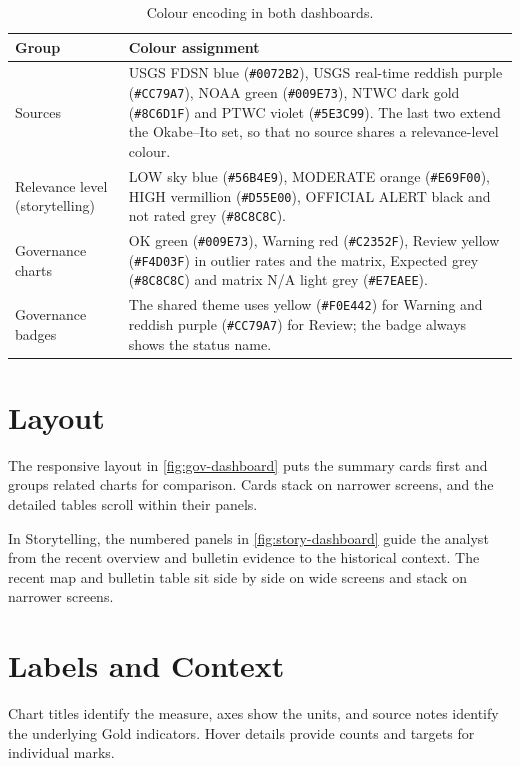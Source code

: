 \documentclass[a4paper,11pt,oneside]{book}
\renewcommand{\arraystretch}{1.25}
\begin{document}
\begin{table}[!htbp]
\centering
\small
\renewcommand{\arraystretch}{1.12}
\captionsetup{skip=6pt}
\begin{tabularx}{\textwidth}{@{}L{2.6cm}Y@{}}
\toprule
Group & Colour assignment \\
\midrule
Sources & USGS FDSN blue (\texttt{\#0072B2}), USGS real-time reddish purple (\texttt{\#CC79A7}), NOAA green (\texttt{\#009E73}), NTWC dark gold (\texttt{\#8C6D1F}) and PTWC violet (\texttt{\#5E3C99}). The last two extend the Okabe--Ito set, so that no source shares a relevance-level colour. \\
Relevance level (storytelling) & LOW sky blue (\texttt{\#56B4E9}), MODERATE orange (\texttt{\#E69F00}), HIGH vermillion (\texttt{\#D55E00}), OFFICIAL ALERT black and not rated grey (\texttt{\#8C8C8C}). \\
Governance charts & OK green (\texttt{\#009E73}), Warning red (\texttt{\#C2352F}), Review yellow (\texttt{\#F4D03F}) in outlier rates and the matrix, Expected grey (\texttt{\#8C8C8C}) and matrix N/A light grey (\texttt{\#E7EAEE}). \\
Governance badges & The shared theme uses yellow (\texttt{\#F0E442}) for Warning and reddish purple (\texttt{\#CC79A7}) for Review; the badge always shows the status name. \\
\bottomrule
\end{tabularx}
\caption{Colour encoding in both dashboards.}
\label{tab:palette}
\end{table}

\FloatBarrier
\section{Layout}
The responsive layout in \cref{fig:gov-dashboard} puts the summary cards first and groups related charts for comparison. Cards stack on narrower screens, and the detailed tables scroll within their panels.

In Storytelling, the numbered panels in \cref{fig:story-dashboard} guide the analyst from the recent overview and bulletin evidence to the historical context. The recent map and bulletin table sit side by side on wide screens and stack on narrower screens.

\section{Labels and Context}
Chart titles identify the measure, axes show the units, and source notes identify the underlying Gold indicators. Hover details provide counts and targets for individual marks.
\end{document}
